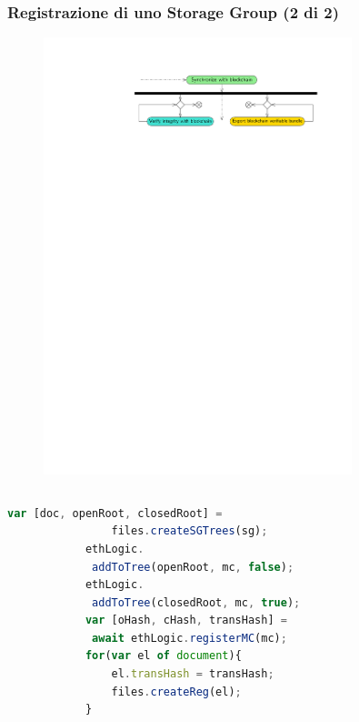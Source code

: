 \documentclass{beamer}
\begin{document}
\begin{frame}[fragile]
	\frametitle{Registrazione di uno Storage Group (2 di 2)}
	\begin{figure}
		\includegraphics[width=0.8\textwidth]{figures/sync.pdf}
	\end{figure}
	\begin{columns}
		\begin{lstlisting}[language=JavaScript, numbers=none]
			var [doc, openRoot, closedRoot] =
				files.createSGTrees(sg);
			ethLogic.
			 addToTree(openRoot, mc, false);
			ethLogic.
			 addToTree(closedRoot, mc, true);
			var [oHash, cHash, transHash] =
			 await ethLogic.registerMC(mc);
			for(var el of document){
				el.transHash = transHash;
				files.createReg(el);
			}
		\end{lstlisting}
		\begin{figure}

\end{figure}
\end{columns}
\end{frame}
\end{document}
